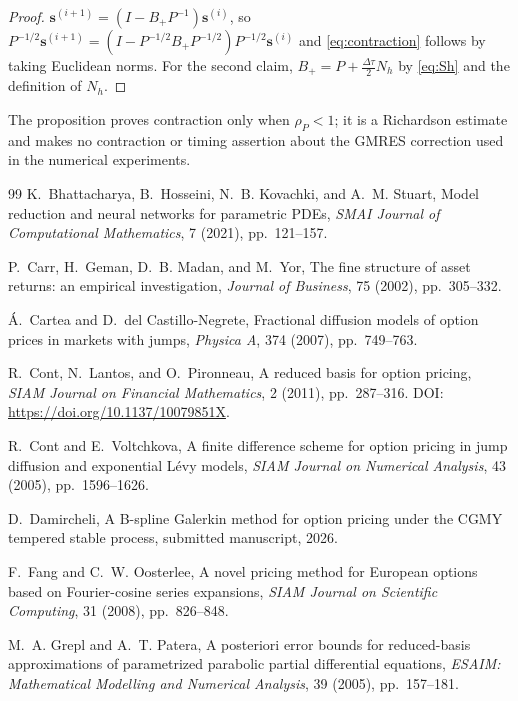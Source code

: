 \documentclass[11pt]{amsart}
\theoremstyle{remark}
\newcommand{\dt}{\Delta\tau}
\newcommand{\sres}{\mathbf s}
\begin{document}
\begin{proof}
$\sres^{(i+1)}=(I-B_+P^{-1})\sres^{(i)}$, so
$P^{-1/2}\sres^{(i+1)}=(I-P^{-1/2}B_+P^{-1/2})P^{-1/2}\sres^{(i)}$ and
\eqref{eq:contraction} follows by taking Euclidean norms.  For the second
claim, $B_+=P+\tfrac{\dt}{2}N_h$ by \eqref{eq:Sh} and the definition of $N_h$.
\end{proof}
The proposition proves contraction only when $\rho_P<1$; it is a
Richardson estimate and makes no contraction or timing assertion about the
GMRES correction used in the numerical experiments.
\FloatBarrier
\begin{thebibliography}{99}
K.~Bhattacharya, B.~Hosseini, N.~B. Kovachki, and A.~M. Stuart,
\newblock Model reduction and neural networks for parametric PDEs,
\newblock \emph{SMAI Journal of Computational Mathematics}, 7 (2021),
pp.~121--157.

P.~Carr, H.~Geman, D.~B. Madan, and M.~Yor,
\newblock The fine structure of asset returns: an empirical investigation,
\newblock \emph{Journal of Business}, 75 (2002), pp.~305--332.

\'A.~Cartea and D.~del Castillo-Negrete,
\newblock Fractional diffusion models of option prices in markets with jumps,
\newblock \emph{Physica A}, 374 (2007), pp.~749--763.

R.~Cont, N.~Lantos, and O.~Pironneau,
\newblock A reduced basis for option pricing,
\newblock \emph{SIAM Journal on Financial Mathematics}, 2 (2011),
pp.~287--316. DOI: \url{https://doi.org/10.1137/10079851X}.

R.~Cont and E.~Voltchkova,
\newblock A finite difference scheme for option pricing in jump diffusion and
exponential L\'evy models,
\newblock \emph{SIAM Journal on Numerical Analysis}, 43 (2005),
pp.~1596--1626.

D.~Damircheli,
\newblock A B-spline Galerkin method for option pricing under the CGMY
tempered stable process,
\newblock submitted manuscript, 2026.

F.~Fang and C.~W. Oosterlee,
\newblock A novel pricing method for European options based on Fourier-cosine
series expansions,
\newblock \emph{SIAM Journal on Scientific Computing}, 31 (2008),
pp.~826--848.

M.~A. Grepl and A.~T. Patera,
\newblock A posteriori error bounds for reduced-basis approximations of
parametrized parabolic partial differential equations,
\newblock \emph{ESAIM: Mathematical Modelling and Numerical Analysis},
39 (2005), pp.~157--181.


\end{thebibliography}
\end{document}

